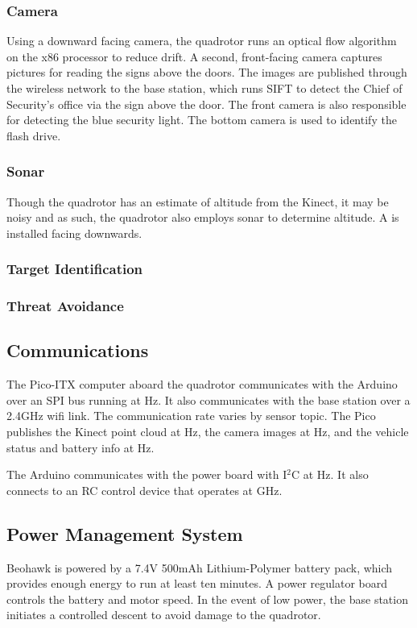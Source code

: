\documentclass[12pt, letterpaper]{article}
\begin{document}
\subsubsection{Camera}
Using a downward facing camera, the quadrotor runs an optical flow algorithm on the x86 processor to reduce drift.  A second, front-facing camera captures pictures for reading the signs above the doors.  The images are published through the wireless network to the base station, which runs SIFT to detect the Chief of Security's office via the sign above the door. The front camera is also responsible for detecting the blue security light.  The bottom camera is used to identify the flash drive.

\subsubsection{Sonar}
Though the quadrotor has an estimate of altitude from the Kinect, it may be noisy and as such, the quadrotor also employs sonar to determine altitude.  A  is installed facing downwards.

\subsubsection{Target Identification}

\subsubsection{Threat Avoidance}

\subsection{Communications}
The Pico-ITX computer aboard the quadrotor communicates with the Arduino over an SPI bus running at  Hz.  It also communicates with the base station over a 2.4GHz wifi link.  The communication rate varies by sensor topic. The Pico publishes the Kinect point cloud at  Hz, the camera images at  Hz, and the vehicle status and battery info at  Hz.

The Arduino communicates with the power board with I$^2$C at  Hz. It also connects to an RC control device that operates at  GHz.

\subsection{Power Management System}
Beohawk is powered by a 7.4V 500mAh Lithium-Polymer battery pack, which provides enough energy to run at least ten minutes. A power regulator board controls the battery and motor speed.  In the event of low power, the base station initiates a controlled descent to avoid damage to the quadrotor. 
\end{document}
